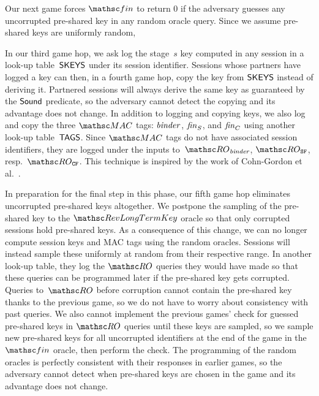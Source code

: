 Our next game forces $\Finalize$ to return $0$ if the adversary guesses any uncorrupted pre-shared key in any random oracle query.
Since we assume pre-shared keys are uniformly random,

In our third game hop, we ask log the stage~$s$ key computed in any session in a look-up table~$\mathsf{SKEYS}$ under its session identifier.
Sessions whose partners have logged a key can then, in a fourth game hop, copy the key from $\mathsf{SKEYS}$ instead of deriving it.
Partnered sessions will always derive the same key as guaranteed by the $\mathsf{Sound}$ predicate, so the adversary cannot detect the copying and its advantage does not change.
In addition to logging and copying keys, we also log and copy the three $\MAC$ tags: $\mathit{binder}$, $\mathit{fin}_S$, and $\mathit{fin}_C$ using another look-up table~$\mathsf{TAGS}$. 
Since $\MAC$ tags do not have associated session identifiers, they are logged under the inputs to~$\RObinder$, $\ROsfin$, resp.\ $\ROcfin$.
This technique is inspired by the work of Cohn-Gordon et al.~\cite{C:CCGJJ19}. 

In preparation for the final step in this phase, our fifth game hop eliminates uncorrupted pre-shared keys altogether.
We postpone the sampling of the pre-shared key to the $\RevLongTermKey$ oracle so that only corrupted sessions hold pre-shared keys.
As a consequence of this change, we can no longer compute session keys and MAC tags using the random oracles.
Sessions will instead sample these uniformly at random from their respective range. 
In another look-up table, they log the $\RO$ queries they would have made so that these queries can be programmed later if the pre-shared key gets corrupted.
Queries to~$\RO$ before corruption cannot contain the pre-shared key thanks to the previous game, so we do not have to worry about consistency with past queries. 
%
We also cannot  implement the previous games' check for guessed pre-shared keys in $\RO$ queries until these keys are sampled,
so we sample new pre-shared keys for all uncorrupted identifiers at the end of the game in the $\Finalize$ oracle, then perform the check.
The programming of the random oracles is perfectly consistent with their responses in earlier games, so the adversary cannot detect when pre-shared keys are chosen in the game and its advantage does not change.

